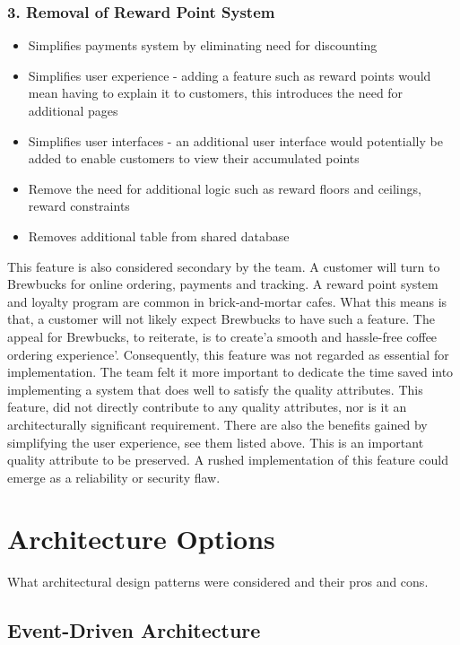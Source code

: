 \documentclass{article}
\begin{document}
\subsubsection*{3. Removal of Reward Point System}
\begin{itemize}
    \item Simplifies payments system by eliminating need for discounting
    \item Simplifies user experience - adding a feature such as reward points would mean having to explain it to customers, this introduces the need for additional pages
    \item Simplifies user interfaces - an additional user interface would potentially be added to enable customers to view their accumulated points
    \item Remove the need for additional logic such as reward floors and ceilings, reward constraints
    \item Removes additional table from shared database
\end{itemize}

\bigskip \noindent This feature is also considered secondary by the team. A customer will turn to Brewbucks for online ordering, payments and tracking. A reward point system and loyalty program are common in brick-and-mortar cafes. What this means is that, a customer will not likely expect Brewbucks to have such a feature. The appeal for Brewbucks, to reiterate, is to create'a smooth and hassle-free coffee ordering experience'. Consequently, this feature was not regarded as essential for implementation. The team felt it more important to dedicate the time saved into implementing a system that does well to satisfy the quality attributes. This feature, did not directly contribute to any quality attributes, nor is it an architecturally significant requirement. There are also the benefits gained by simplifying the user experience, see them listed above. This is an important quality attribute to be preserved. A rushed implementation of this feature could emerge as a reliability or security flaw.

\section{Architecture Options}
What architectural design patterns were considered and their pros and cons.

\subsection{Event-Driven Architecture}
\end{document}
